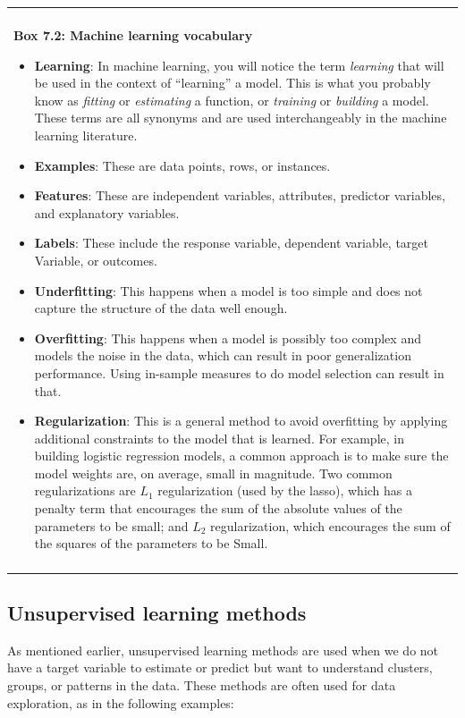 \documentclass[]{krantz}
\newenvironment{F00}
    {\begin{center}
    \begin{tabular}{|p{0.9\textwidth}|}
    \hline\\
    }
    { 
    \\\\\hline
    \end{tabular} 
    \end{center}
    }
\begin{document}
\begin{F00}
\textbf{Box 7.2: Machine learning vocabulary}

\begin{itemize}
\item
  \textbf{Learning}: In machine learning, you will notice the term
  \emph{learning} that will be used in the context of ``learning'' a
  model. This is what you probably know as \emph{fitting} or
  \emph{estimating} a function, or \emph{training} or \emph{building} a
  model. These terms are all synonyms and are used interchangeably in
  the machine learning literature.
\item
  \textbf{Examples}: These are data points, rows, or instances.
\item
  \textbf{Features}: These are independent variables, attributes,
  predictor variables, and explanatory variables.
\item
  \textbf{Labels}: These include the response variable, dependent
  variable, target Variable, or outcomes.
\item
  \textbf{Underfitting}: This happens when a model is too simple and
  does not capture the structure of the data well enough.
\item
  \textbf{Overfitting}: This happens when a model is possibly too
  complex and models the noise in the data, which can result in poor
  generalization performance. Using in-sample measures to do model
  selection can result in that.
\item
  \textbf{Regularization}: This is a general method to avoid overfitting
  by applying additional constraints to the model that is learned. For
  example, in building logistic regression models, a common approach is
  to make sure the model weights are, on average, small in magnitude.
  Two common regularizations are \(L_1\) regularization (used by the
  lasso), which has a penalty term that encourages the sum of the
  absolute values of the parameters to be small; and \(L_2\)
  regularization, which encourages the sum of the squares of the
  parameters to be Small.
\end{itemize}
\end{F00}

\subsection{Unsupervised learning
methods}\label{unsupervised-learning-methods}

As mentioned earlier, unsupervised learning methods are used when we do
not have a target variable to estimate or predict but want to understand
clusters, groups, or patterns in the data. These methods are often used
for data exploration, as in the following examples:
\end{document}
